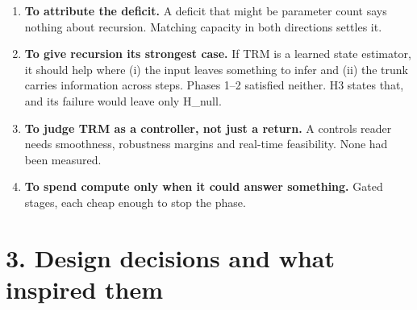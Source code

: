 \documentclass[11pt]{article}
\begin{document}
\begin{enumerate}
\item \textbf{To attribute the deficit.} A deficit that might be parameter count says nothing about recursion. Matching capacity in both directions settles it.
\item \textbf{To give recursion its strongest case.} If TRM is a learned state estimator, it should help where (i) the input leaves something to infer and (ii) the trunk carries information across steps. Phases 1--2 satisfied neither. H3 states that, and its failure would leave only H\_null.
\item \textbf{To judge TRM as a controller, not just a return.} A controls reader needs smoothness, robustness margins and real-time feasibility. None had been measured.
\item \textbf{To spend compute only when it could answer something.} Gated stages, each cheap enough to stop the phase.
\end{enumerate}



\section*{3. Design decisions and what inspired them}
\end{document}
